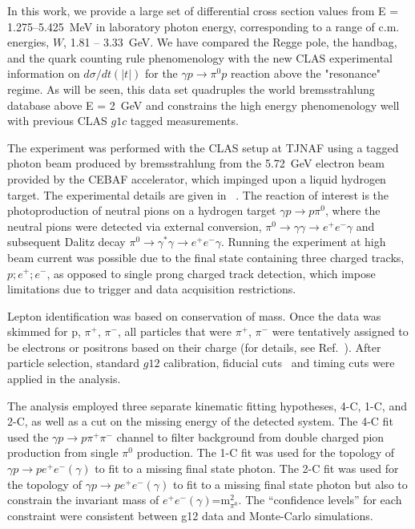 \documentclass[aps,prc,twocolumn,floatfix,showpacs,preprintnumbers,amsmath,amssymb,superscriptaddress]{revtex4-1}
\begin{document}
In this work, we provide a large set of differential cross section values from 
E = 1.275--5.425~MeV in laboratory photon energy, 
corresponding to a range of c.m. energies, $W$, 1.81 -- 3.33~GeV.  
We have 
compared the Regge pole, the
handbag, and the quark counting rule phenomenology with the 
new CLAS experimental information on $d\sigma/dt(|t|)$ 
for the $\gamma p\to\pi^0p$ reaction above the "resonance" regime. As will 
be seen, this data set quadruples the world bremsstrahlung 
database above E = 2~GeV and constrains the high energy 
phenomenology well with previous CLAS $g1c$ tagged measurements.

The experiment was performed with the CLAS setup 
at TJNAF using a tagged photon beam produced by bremsstrahlung 
from the 5.72~GeV electron beam provided by the CEBAF accelerator, which impinged upon a 
liquid hydrogen target. The experimental details are given 
in ~\cite{g12}. The reaction of interest is the photoproduction 
of neutral pions on a hydrogen target $\gamma p\to p\pi^0$, where
the neutral pions were detected via external conversion, $\pi^0 \rightarrow \gamma \gamma \rightarrow e^+e^-\gamma$ and subsequent Dalitz decay $\pi^0\to \gamma^\ast
\gamma\to e^+e^-\gamma$. 
Running the experiment at high beam current was possible due to the final state containing three charged tracks, $p;e^+;e^-$, as opposed to single prong charged track detection, which impose limitations due to trigger and data acquisition restrictions.

Lepton identification was based on conservation of mass. Once 
the data was skimmed for p, $\pi^+$, $\pi^-$, all particles that 
were $\pi^+$, $\pi^-$ were tentatively assigned to be electrons 
or positrons based on their charge (for details, see 
Ref.~\cite{Kunkel}).  After particle selection, standard $g12$ 
calibration, fiducial cuts~\cite{g12} and timing cuts were 
applied in the analysis.

The analysis employed three separate kinematic fitting 
hypotheses, 4-C, 1-C, and 2-C, as well as a cut on the missing 
energy of the detected system. The 4-C fit used the $\gamma p\to 
p\pi^+\pi^-$ channel to filter background from double charged 
pion production from single $\pi^0$ production. The 1-C fit
was used for the topology of $\gamma p\to pe^+e^-(\gamma)$ to 
fit to a missing final state photon.  The 2-C fit was used for 
the topology of $\gamma p\to pe^+e^-(\gamma)$ to fit to a 
missing final state photon but also to constrain the invariant 
mass of $e^+e^-(\gamma)$=m$^2_{\pi^0}$. The ``confidence levels''
for each constraint were consistent between g12 data 
and Monte-Carlo simulations.
\end{document}

